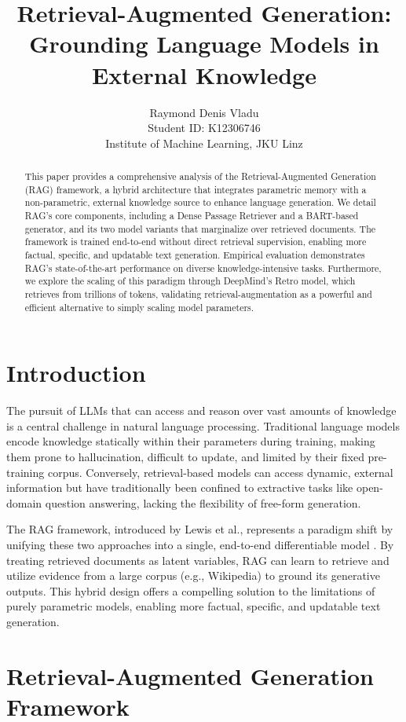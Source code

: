 \documentclass[a4paper,12pt]{article}
\title{Retrieval-Augmented Generation: Grounding Language Models in External Knowledge}
\author{
Raymond Denis Vladu \\
Student ID: K12306746 \\
Institute of Machine Learning, JKU Linz
}
\begin{document}
\maketitle

\begin{abstract}
This paper provides a comprehensive analysis of the Retrieval-Augmented Generation (RAG) framework, a hybrid architecture that integrates parametric memory with a non-parametric, external knowledge source to enhance language generation. We detail RAG's core components, including a Dense Passage Retriever and a BART-based generator, and its two model variants that marginalize over retrieved documents. The framework is trained end-to-end without direct retrieval supervision, enabling more factual, specific, and updatable text generation. Empirical evaluation demonstrates RAG's state-of-the-art performance on diverse knowledge-intensive tasks. Furthermore, we explore the scaling of this paradigm through DeepMind's Retro model, which retrieves from trillions of tokens, validating retrieval-augmentation as a powerful and efficient alternative to simply scaling model parameters.
\end{abstract}

\section{Introduction}
The pursuit of LLMs that can access and reason over vast amounts of knowledge is a central challenge in natural language processing. Traditional language models encode knowledge statically within their parameters during training, making them prone to hallucination, difficult to update, and limited by their fixed pre-training corpus. Conversely, retrieval-based models can access dynamic, external information but have traditionally been confined to extractive tasks like open-domain question answering, lacking the flexibility of free-form generation.

The RAG framework, introduced by Lewis et al., represents a paradigm shift by unifying these two approaches into a single, end-to-end differentiable model \cite{lewis2020rag}. By treating retrieved documents as latent variables, RAG can learn to retrieve and utilize evidence from a large corpus (e.g., Wikipedia) to ground its generative outputs. This hybrid design offers a compelling solution to the limitations of purely parametric models, enabling more factual, specific, and updatable text generation.

\section{Retrieval-Augmented Generation Framework}
\end{document}
